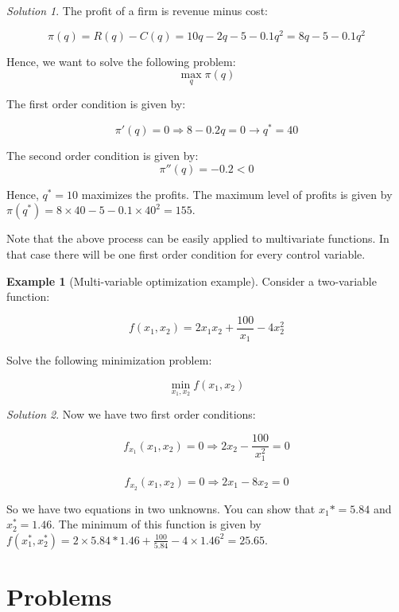\documentclass[
]{book}
\theoremstyle{definition}
\theoremstyle{definition}
\newtheorem{example}{Example}[chapter]
\theoremstyle{definition}
\theoremstyle{definition}
\theoremstyle{remark}
\newtheorem*{solution}{Solution}
\begin{document}
\begin{solution}
The profit of a firm is revenue minus cost:

\[\pi(q)= R(q) -C(q)= 10q-2q-5-0.1q^2=8q-5-0.1q^2\]

Hence, we want to solve the following problem:
\[\max_{q} \pi(q)\]

The first order condition is given by:

\[\pi'(q)=0 \Rightarrow 8-0.2q=0 \rightarrow q^*=40 \]

The second order condition is given by:
\[\pi''(q)=-0.2<0\]

Hence, \(q^*=10\) maximizes the profits. The maximum level of profits is given by \(\pi(q^*)=8\times 40-5-0.1\times 40^2=155\).
\end{solution}

Note that the above process can be easily applied to multivariate functions. In that case there will be one first order condition for every control variable.

\begin{example}[Multi-variable optimization example]
\protect\hypertarget{exm:unnamed-chunk-15}{}\label{exm:unnamed-chunk-15}Consider a two-variable function:

\[f(x_1,x_2)=2x_1x_2 + \frac{100}{x_1} - 4x_2^2\]

Solve the following minimization problem:

\[\min_{x_1,x_2} f(x_1,x_2)\]
\end{example}

\begin{solution}
Now we have two first order conditions:

\[f_{x_1}(x_1,x_2) = 0 \Rightarrow 2x_2 -\frac{100}{x_1^2}=0\]\\
\[f_{x_2}(x_1,x_2) = 0 \Rightarrow 2x_1 -8x_2=0\]

So we have two equations in two unknowns. You can show that \(x_1*=5.84\) and \(x_2^*=1.46\). The minimum of this function is given by \(f(x_1^*,x_2^*)=2\times 5.84*1.46+\frac{100}{5.84} - 4\times 1.46^2=25.65\).
\end{solution}

\hypertarget{problems}{%
\section*{Problems}\label{problems}}
\end{document}
